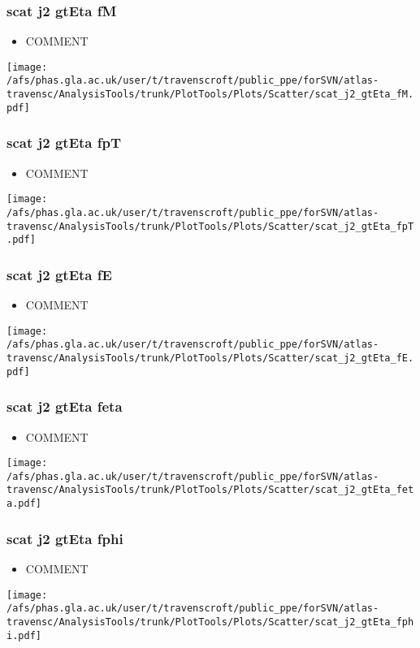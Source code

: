 \documentclass{beamer}
\begin{document}
\begin{frame}
\frametitle{scat j2 gtEta fM}
\begin{itemize}
\item COMMENT
\end{itemize}
\begin{center}
\texttt{[image: /afs/phas.gla.ac.uk/user/t/travenscroft/public\_ppe/forSVN/atlas-travensc/AnalysisTools/trunk/PlotTools/Plots/Scatter/scat\_j2\_gtEta\_fM.pdf]}
\end{center}
\end{frame}

\begin{frame}
\frametitle{scat j2 gtEta fpT}
\begin{itemize}
\item COMMENT
\end{itemize}
\begin{center}
\texttt{[image: /afs/phas.gla.ac.uk/user/t/travenscroft/public\_ppe/forSVN/atlas-travensc/AnalysisTools/trunk/PlotTools/Plots/Scatter/scat\_j2\_gtEta\_fpT.pdf]}
\end{center}
\end{frame}

\begin{frame}
\frametitle{scat j2 gtEta fE}
\begin{itemize}
\item COMMENT
\end{itemize}
\begin{center}
\texttt{[image: /afs/phas.gla.ac.uk/user/t/travenscroft/public\_ppe/forSVN/atlas-travensc/AnalysisTools/trunk/PlotTools/Plots/Scatter/scat\_j2\_gtEta\_fE.pdf]}
\end{center}
\end{frame}

\begin{frame}
\frametitle{scat j2 gtEta feta}
\begin{itemize}
\item COMMENT
\end{itemize}
\begin{center}
\texttt{[image: /afs/phas.gla.ac.uk/user/t/travenscroft/public\_ppe/forSVN/atlas-travensc/AnalysisTools/trunk/PlotTools/Plots/Scatter/scat\_j2\_gtEta\_feta.pdf]}
\end{center}
\end{frame}

\begin{frame}
\frametitle{scat j2 gtEta fphi}
\begin{itemize}
\item COMMENT
\end{itemize}
\begin{center}
\texttt{[image: /afs/phas.gla.ac.uk/user/t/travenscroft/public\_ppe/forSVN/atlas-travensc/AnalysisTools/trunk/PlotTools/Plots/Scatter/scat\_j2\_gtEta\_fphi.pdf]}
\end{center}
\end{frame}
\end{document}
